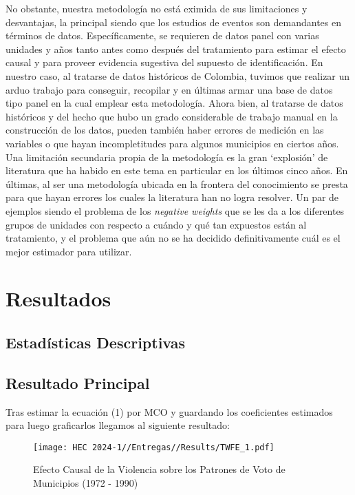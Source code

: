 \documentclass[a4paper]{article}
\begin{document}
No obstante, nuestra metodología no está eximida de sus limitaciones y desvantajas, la principal siendo que los estudios de eventos son demandantes en términos de datos. Específicamente, se requieren de datos panel con varias unidades y años tanto antes como después del tratamiento para estimar el efecto causal y para proveer evidencia sugestiva del supuesto de identificación. En nuestro caso, al tratarse de datos históricos de Colombia, tuvimos que realizar un arduo trabajo para conseguir, recopilar y en últimas armar una base de datos tipo panel en la cual emplear esta metodología. Ahora bien, al tratarse de datos históricos y del hecho que hubo un grado considerable de trabajo manual en la construcción de los datos, pueden también haber errores de medición en las variables o que hayan incompletitudes para algunos municipios en ciertos años. \\

Una limitación secundaria propia de la metodología es la gran `explosión' de literatura que ha habido en este tema en particular en los últimos cinco años. En últimas, al ser una metodología ubicada en la frontera del conocimiento se presta para que hayan errores los cuales la literatura han no logra resolver. Un par de ejemplos siendo el problema de los \textit{negative weights} que se les da a los diferentes grupos de unidades con respecto a cuándo y qué tan expuestos están al tratamiento, y el problema que aún no se ha decidido definitivamente cuál es el mejor estimador para utilizar.


\section{Resultados}
\subsection{Estadísticas Descriptivas}


\subsection{Resultado Principal}
Tras estimar la ecuación (1) por MCO y guardando los coeficientes estimados para luego graficarlos llegamos al siguiente resultado:
\begin{figure}[H]
    \centering
    \caption{Efecto Causal de la Violencia sobre los Patrones de Voto de Municipios (1972 - 1990)}
    \texttt{[image: HEC 2024-1//Entregas//Results/TWFE\_1.pdf]}
    \label{fig:Main}
\end{figure}
\end{document}
